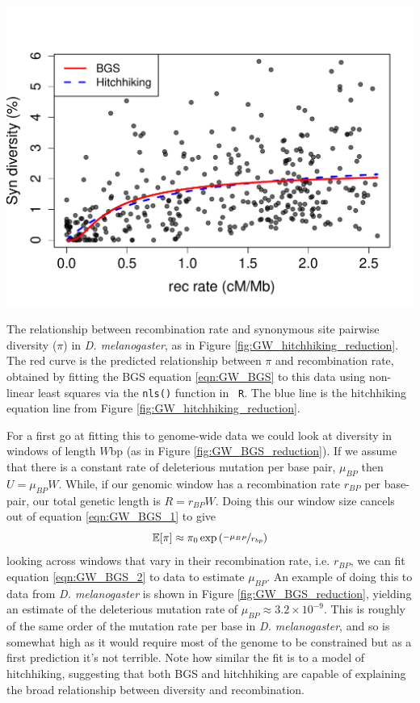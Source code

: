 \begin{marginfigure}
\begin{center}
\includegraphics[width=\textwidth]{figures/Genomewide_BGS_HH.pdf}
\end{center}
\caption{The relationship between recombination rate and synonymous
  site pairwise diversity ($\pi$) in {\it D. melanogaster}, as
  in Figure \ref{fig:GW_hitchhiking_reduction}. The red curve is the
  predicted relationship between $\pi$ and recombination rate, obtained
  by fitting the BGS equation \eqref{eqn:GW_BGS} to this data  
 using non-linear least squares via the {\tt nls()} function in {\tt
   R}. The blue line is the hitchhiking equation line from Figure
 \ref{fig:GW_hitchhiking_reduction}. } \label{fig:GW_BGS_reduction}
\end{marginfigure}

For a first go at fitting this to genome-wide data we could look at
diversity in windows of length $W$bp (as in Figure \ref{fig:GW_BGS_reduction}). If we assume that there is a constant rate of
deleterious mutation per base pair, $\mu_{BP}$ then $U=\mu_{BP}W$. While, if our genomic window has a
recombination rate $r_{BP}$ per base-pair, our total genetic length is
$R=r_{BP}W$. Doing this our window size cancels out of equation
\eqref{eqn:GW_BGS_1} to give
\begin{equation}
  \mathbb{E}[\pi] \approx \pi_0 \exp \left(\nicefrac{-\mu_{BP}}{r_{bp}}
  \right) \label{eqn:GW_BGS_2}
 \end{equation}
looking across windows that vary in their recombination rate,
i.e. $r_{BP}$, we can fit equation \eqref{eqn:GW_BGS_2} to data to
estimate $\mu_{BP}$. An example of doing this to data from {\it D. melanogaster}
  is shown in Figure
\ref{fig:GW_BGS_reduction}, yielding an estimate of the deleterious
mutation rate of $\mu_{BP}\approx
3.2 \times 10^{-9}$. This is roughly of the same order of the mutation
rate per base in  {\it D. melanogaster}, and so is somewhat high as it
would require most of the genome to be constrained but as a first
prediction it's not terrible. Note how similar the fit is to a model of
hitchhiking, suggesting that both BGS and hitchhiking are capable of explaining the
broad relationship between diversity and recombination.

